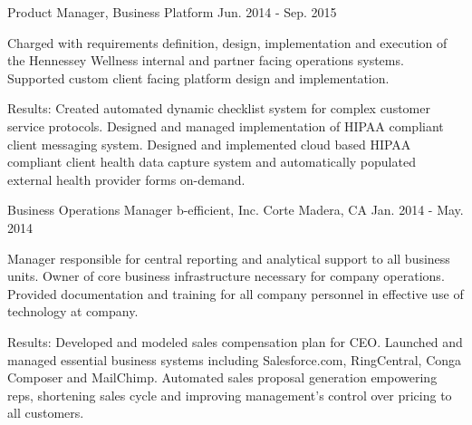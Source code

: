 \begin{cventries}

\cventry
{Product Manager, Business Platform} %
{} %
{} %
{Jun. 2014 - Sep. 2015} %
{ %
\begin{cvitems}
\item {Charged with requirements definition, design, implementation and execution of the Hennessey Wellness internal and partner facing operations systems. Supported custom client facing platform design and implementation.}
\end{cvitems}
}
\begin{cvitemsnb}
\item {Results: Created automated dynamic checklist system for complex customer service protocols. Designed and managed implementation of HIPAA compliant client messaging system. Designed and implemented cloud based HIPAA compliant client health data capture system and automatically populated external health provider forms on-demand.}
\end{cvitemsnb}



\cventry
{Business Operations Manager} %
{b-efficient, Inc.} %
{Corte Madera, CA} %
{Jan. 2014 - May. 2014} %
{ %
\begin{cvitems}
\item {Manager responsible for central reporting and analytical support to all business units. Owner of core business infrastructure necessary for company operations. Provided documentation and training for all company personnel in effective use of technology at company.}
\end{cvitems}
}
\begin{cvitemsnb}
\item {Results: Developed and modeled sales compensation plan for CEO. Launched and managed essential business systems including Salesforce.com, RingCentral, Conga Composer and MailChimp. Automated sales proposal generation empowering reps, shortening sales cycle and improving management's control over pricing to all customers.}
\end{cvitemsnb}


\end{cventries}
